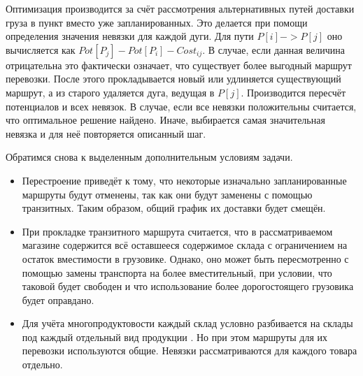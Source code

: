 	Оптимизация производится за счёт рассмотрения альтернативных путей доставки груза в пункт вместо уже запланированных. Это делается при помощи определения значения невязки для каждой дуги. Для пути $P[i] -> P[j]$ оно вычисляется как $Pot[P_j] - Pot[P_i] - Cost_{ij}$. В случае, если данная величина отрицательна это фактически означает, что существует более выгодный маршрут перевозки. После этого прокладывается новый или удлиняется существующий маршрут, а из старого удаляется дуга, ведущая в $P[j]$. Производится пересчёт потенциалов и всех невязок. В случае, если все невязки положительны считается, что оптимальное решение найдено. Иначе, выбирается самая значительная невязка и для неё повторяется описанный шаг.
	
	Обратимся снова к выделенным дополнительным условиям задачи.
	\begin{itemize}
		\item Перестроение приведёт к тому, что некоторые изначально запланированные маршруты будут отменены, так как они будут заменены с помощью транзитных. Таким образом, общий график их доставки будет смещён.
		\item При прокладке транзитного маршрута считается, что в рассматриваемом магазине содержится всё оставшееся содержимое склада с ограничением на остаток вместимости в грузовике\cite{potential:transit}. Однако, оно может быть пересмотренно с помощью замены транспорта на более вместительный, при условии, что таковой будет свободен и что использование более дорогостоящего грузовика будет оправдано.
		\item Для учёта многопродуктовости каждый склад условно разбивается на склады под каждый отдельный вид продукции \cite{potential:polyprod}. Но при этом маршруты для их перевозки используются общие. Невязки рассматриваются для каждого товара отдельно.
	\end{itemize}

\pagebreak